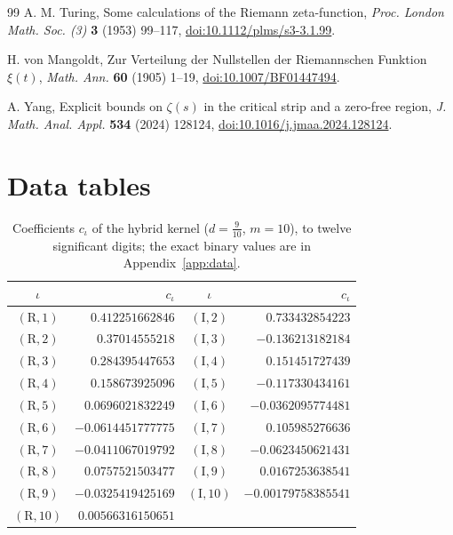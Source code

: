 \documentclass[11pt,reqno]{amsart}
\numberwithin{equation}{section}
\theoremstyle{definition}
\theoremstyle{remark}
\begin{document}
\begin{thebibliography}{99}
 A. M. Turing, Some calculations of the Riemann zeta-function, \textit{Proc. London Math. Soc. (3)} \textbf{3} (1953) 99--117, \href{https://doi.org/10.1112/plms/s3-3.1.99}{doi:10.1112/plms/s3-3.1.99}.

 H. von Mangoldt, Zur Verteilung der Nullstellen der Riemannschen Funktion $\xi(t)$, \textit{Math. Ann.} \textbf{60} (1905) 1--19, \href{https://doi.org/10.1007/BF01447494}{doi:10.1007/BF01447494}.

 A. Yang, Explicit bounds on $\zeta(s)$ in the critical strip and a zero-free region, \textit{J. Math. Anal. Appl.} \textbf{534} (2024) 128124, \href{https://doi.org/10.1016/j.jmaa.2024.128124}{doi:10.1016/j.jmaa.2024.128124}.

\end{thebibliography}

\appendix
\section{Data tables}\label{app:tables}
\begin{table}[ht]\centering\small
\begin{tabular}{@{}cr@{\quad}cr@{}}\toprule $\iota$ & $c_\iota$ & $\iota$ & $c_\iota$\\\midrule
$(\mathrm R,1)$ & $0.412251662846$ & $(\mathrm I,2)$ & $0.733432854223$\\
$(\mathrm R,2)$ & $0.37014555218$ & $(\mathrm I,3)$ & $-0.136213182184$\\
$(\mathrm R,3)$ & $0.284395447653$ & $(\mathrm I,4)$ & $0.151451727439$\\
$(\mathrm R,4)$ & $0.158673925096$ & $(\mathrm I,5)$ & $-0.117330434161$\\
$(\mathrm R,5)$ & $0.0696021832249$ & $(\mathrm I,6)$ & $-0.0362095774481$\\
$(\mathrm R,6)$ & $-0.0614451777775$ & $(\mathrm I,7)$ & $0.105985276636$\\
$(\mathrm R,7)$ & $-0.0411067019792$ & $(\mathrm I,8)$ & $-0.0623450621431$\\
$(\mathrm R,8)$ & $0.0757521503477$ & $(\mathrm I,9)$ & $0.0167253638541$\\
$(\mathrm R,9)$ & $-0.0325419425169$ & $(\mathrm I,10)$ & $-0.00179758385541$\\
$(\mathrm R,10)$ & $0.00566316150651$ & & \\
\bottomrule\end{tabular}
\caption{Coefficients $c_\iota$ of the hybrid kernel ($d=\frac9{10}$, $m=10$), to twelve significant digits; the exact binary values are in Appendix~\ref{app:data}.}\label{tab:hybrid_kernel}\end{table}
\end{document}
